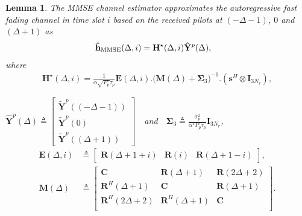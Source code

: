 \documentclass[conference, a4paper, 10pt]{IEEEtran}
\newtheorem{lem}{Lemma}
\newcommand{\mx}[1]{\mathbf{#1}}
\begin{document}
\begin{lem}
\label{lem:mmsechannel}	
The \textup{MMSE} channel estimator approximates the autoregressive fast fading channel in time slot $i$
based on the received pilots at $(-\Delta-1)$, $0$ and $(\Delta+1)$ as
\begin{align}
\label{eq:hmmse}
&\mathbf{\hat h}_{\textup{MMSE}}(\Delta,i)=
\mx{H^\star}(\Delta,i) \mathbf{\hat Y}^p(\Delta),
\end{align}
where
\begin{align*}
\mx{H^\star}(\Delta, i) = \frac{1}{\alpha \sqrt{P_p} \tau_p} \mx{E}(\Delta,i). \big(\mx{M}(\Delta)+\mx{\Sigma}_3\big)^{-1}.(\mx{s}^H\otimes \mx{I}_{3N_r}),
\end{align*}

$\mathbf{\hat Y}^p(\Delta) \triangleq \begin{bmatrix}
\mathbf{\tilde Y}^p((-\Delta-1)) \\
\mathbf{\tilde Y}^p(0) \\
\mathbf{\tilde Y}^p((\Delta+1))
\end{bmatrix}$~~and~~$\mx{\Sigma}_3\triangleq \frac{\sigma_p^2}{\alpha^2P_p \tau_p} \mx{I}_{3N_r}$,
\begin{align}
\label{eq:E}
\mx{E}(\Delta,i) &\triangleq
\begin{bmatrix}
\mx{R}(\Delta \!+\! 1 \!+\! i) & \mx{R}(i) &
\mx{R}(\Delta \!+\! 1 \!-\! i)
\end{bmatrix},
\\
\label{eq:M}
\mx{M}(\Delta) &\triangleq
\begin{bmatrix}
\mx{C} & \mx{R}(\Delta \!+\! 1) & \mx{R}(2\Delta \!+\! 2)  \\
\mx{R}^H(\Delta \!+\! 1) & \mx{C} & \mx{R}(\Delta \!+\! 1) \\
\mx{R}^H(2\Delta \!+\! 2) & \mx{R}^H(\Delta \!+\! 1) & \mx{C}\\
\end{bmatrix}.
\end{align}

\end{lem}
\end{document}
